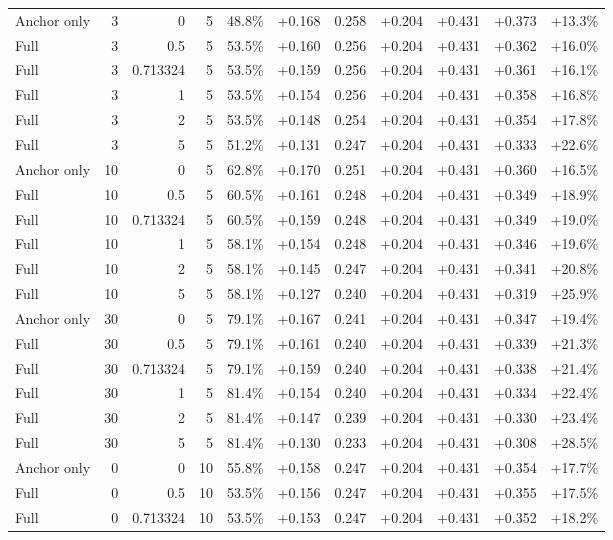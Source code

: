 \begin{table}[htbp]
\begin{tabular}{lrrrccccccc}
Anchor only & 3 & 0 & 5 & 48.8\% & +0.168 & 0.258 & +0.204 & +0.431 & +0.373 & +13.3\% \\
Full & 3 & 0.5 & 5 & 53.5\% & +0.160 & 0.256 & +0.204 & +0.431 & +0.362 & +16.0\% \\
Full & 3 & 0.713324 & 5 & 53.5\% & +0.159 & 0.256 & +0.204 & +0.431 & +0.361 & +16.1\% \\
Full & 3 & 1 & 5 & 53.5\% & +0.154 & 0.256 & +0.204 & +0.431 & +0.358 & +16.8\% \\
Full & 3 & 2 & 5 & 53.5\% & +0.148 & 0.254 & +0.204 & +0.431 & +0.354 & +17.8\% \\
Full & 3 & 5 & 5 & 51.2\% & +0.131 & 0.247 & +0.204 & +0.431 & +0.333 & +22.6\% \\
Anchor only & 10 & 0 & 5 & 62.8\% & +0.170 & 0.251 & +0.204 & +0.431 & +0.360 & +16.5\% \\
Full & 10 & 0.5 & 5 & 60.5\% & +0.161 & 0.248 & +0.204 & +0.431 & +0.349 & +18.9\% \\
Full & 10 & 0.713324 & 5 & 60.5\% & +0.159 & 0.248 & +0.204 & +0.431 & +0.349 & +19.0\% \\
Full & 10 & 1 & 5 & 58.1\% & +0.154 & 0.248 & +0.204 & +0.431 & +0.346 & +19.6\% \\
Full & 10 & 2 & 5 & 58.1\% & +0.145 & 0.247 & +0.204 & +0.431 & +0.341 & +20.8\% \\
Full & 10 & 5 & 5 & 58.1\% & +0.127 & 0.240 & +0.204 & +0.431 & +0.319 & +25.9\% \\
Anchor only & 30 & 0 & 5 & 79.1\% & +0.167 & 0.241 & +0.204 & +0.431 & +0.347 & +19.4\% \\
Full & 30 & 0.5 & 5 & 79.1\% & +0.161 & 0.240 & +0.204 & +0.431 & +0.339 & +21.3\% \\
Full & 30 & 0.713324 & 5 & 79.1\% & +0.159 & 0.240 & +0.204 & +0.431 & +0.338 & +21.4\% \\
Full & 30 & 1 & 5 & 81.4\% & +0.154 & 0.240 & +0.204 & +0.431 & +0.334 & +22.4\% \\
Full & 30 & 2 & 5 & 81.4\% & +0.147 & 0.239 & +0.204 & +0.431 & +0.330 & +23.4\% \\
Full & 30 & 5 & 5 & 81.4\% & +0.130 & 0.233 & +0.204 & +0.431 & +0.308 & +28.5\% \\
Anchor only & 0 & 0 & 10 & 55.8\% & +0.158 & 0.247 & +0.204 & +0.431 & +0.354 & +17.7\% \\
Full & 0 & 0.5 & 10 & 53.5\% & +0.156 & 0.247 & +0.204 & +0.431 & +0.355 & +17.5\% \\
Full & 0 & 0.713324 & 10 & 53.5\% & +0.153 & 0.247 & +0.204 & +0.431 & +0.352 & +18.2\% \\

\end{tabular}
\end{table}
